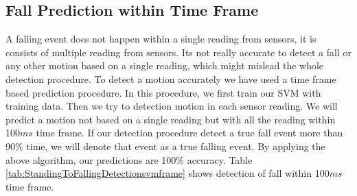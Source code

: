 \documentclass[letterpaper]{article}
\begin{document}
%
%
%

\subsection*{Fall Prediction within Time Frame}

A falling event does not happen within a single reading from sensors, it is consists of multiple
reading from sensors.  Its not really accurate to detect a fall or any other motion based on a
single reading, which might mislead the whole detection procedure. To detect a motion accurately we
have used a time frame based prediction procedure. In this procedure, we first train our SVM with
training data. Then we try to detection motion in each sensor reading. We will predict a motion not
based on a single reading but with all the reading within 100$ms$ time frame. If our detection
procedure detect a true fall event more than 90\% time, we will denote that event as a true
falling event. By applying the above algorithm, our predictions are 100\% accuracy.
Table \ref{tab:StandingToFallingDetectionsvmframe} shows detection of fall within 100$ms$ time
frame.
\end{document}

